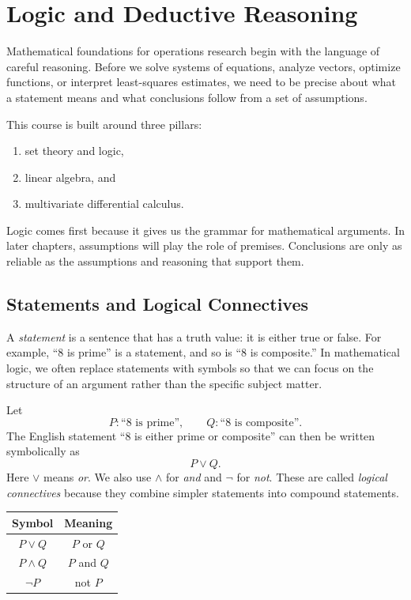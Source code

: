 \chapter{Logic and Deductive Reasoning}
\label{mf:ch01-logic-deductive-reasoning}
\label{mf:logic-course-frame}

Mathematical foundations for operations research begin with the language of careful reasoning. Before we solve systems of equations, analyze vectors, optimize functions, or interpret least-squares estimates, we need to be precise about what a statement means and what conclusions follow from a set of assumptions.

This course is built around three pillars:
\begin{enumerate}
    \item set theory and logic,
    \item linear algebra, and
    \item multivariate differential calculus.
\end{enumerate}
Logic comes first because it gives us the grammar for mathematical arguments. In later chapters, assumptions will play the role of premises. Conclusions are only as reliable as the assumptions and reasoning that support them.

\section{Statements and Logical Connectives}
\label{mf:logic-statements}
\label{mf:logic-connectives}

A \emph{statement} is a sentence that has a truth value: it is either true or false. For example, ``8 is prime'' is a statement, and so is ``8 is composite.'' In mathematical logic, we often replace statements with symbols so that we can focus on the structure of an argument rather than the specific subject matter.

Let
\[
P: \text{``8 is prime''},
\qquad
Q: \text{``8 is composite''}.
\]
The English statement ``8 is either prime or composite'' can then be written symbolically as
\[
P \lor Q.
\]
Here \(\lor\) means \emph{or}. We also use \(\land\) for \emph{and} and \(\neg\) for \emph{not}. These are called \emph{logical connectives} because they combine simpler statements into compound statements.

\begin{center}
\begin{tabular}{c c}
\hline
Symbol & Meaning \\
\hline
\(P \lor Q\) & \(P\) or \(Q\) \\
\(P \land Q\) & \(P\) and \(Q\) \\
\(\neg P\) & not \(P\) \\
\hline
\end{tabular}
\end{center}

